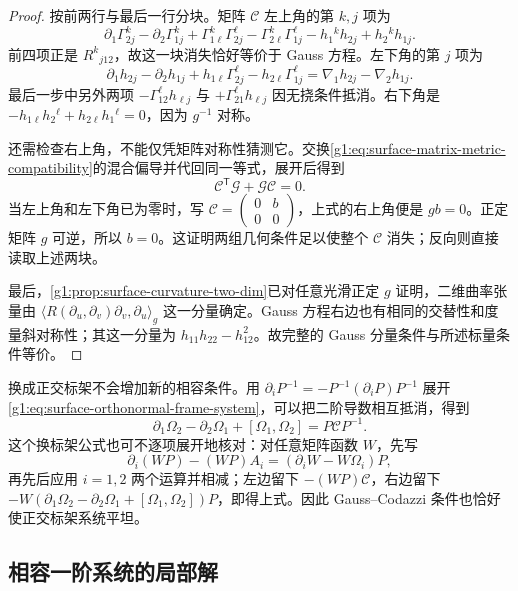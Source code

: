 \begin{proof}
	按前两行与最后一行分块。矩阵 \(\mathcal C\) 左上角的第 \(k,j\) 项为
	\[
		\partial_1\Gamma^k_{2j}-\partial_2\Gamma^k_{1j}
		+\Gamma^k_{1\ell}\Gamma^\ell_{2j}-\Gamma^k_{2\ell}\Gamma^\ell_{1j}
		-h_1{}^kh_{2j}+h_2{}^kh_{1j}.
	\]
	前四项正是 \(R^k{}_{j12}\)，故这一块消失恰好等价于 Gauss 方程。左下角的第 \(j\) 项为
	\[
		\partial_1h_{2j}-\partial_2h_{1j}
		+h_{1\ell}\Gamma^\ell_{2j}-h_{2\ell}\Gamma^\ell_{1j}
		=\nabla_1h_{2j}-\nabla_2h_{1j}.
	\]
	最后一步中另外两项 \(-\Gamma^\ell_{12}h_{\ell j}\) 与 \(+\Gamma^\ell_{21}h_{\ell j}\) 因无挠条件抵消。右下角是 \(-h_{1\ell}h_2{}^\ell+h_{2\ell}h_1{}^\ell=0\)，因为 \(g^{-1}\) 对称。

	还需检查右上角，不能仅凭矩阵对称性猜测它。交换\eqref{g1:eq:surface-matrix-metric-compatibility}的混合偏导并代回同一等式，展开后得到
	\[
		\mathcal C^{\mathsf T}\mathcal G+\mathcal G\mathcal C=0.
	\]
	当左上角和左下角已为零时，写 \(\mathcal C=\left(\begin{smallmatrix}0&b\\0&0\end{smallmatrix}\right)\)，上式的右上角便是 \(gb=0\)。正定矩阵 \(g\) 可逆，所以 \(b=0\)。这证明两组几何条件足以使整个 \(\mathcal C\) 消失；反向则直接读取上述两块。

	最后，\cref{g1:prop:surface-curvature-two-dim}已对任意光滑正定 \(g\) 证明，二维曲率张量由 \(\langle R(\partial_u,\partial_v)\partial_v,\partial_u\rangle_g\) 这一分量确定。Gauss 方程右边也有相同的交替性和度量斜对称性；其这一分量为 \(h_{11}h_{22}-h_{12}^2\)。故完整的 Gauss 分量条件与所述标量条件等价。
\end{proof}

换成正交标架不会增加新的相容条件。用 \(\partial_iP^{-1}=-P^{-1}(\partial_iP)P^{-1}\) 展开\eqref{g1:eq:surface-orthonormal-frame-system}，可以把二阶导数相互抵消，得到
\begin{equation}
	\label{g1:eq:surface-flatness-change-frame}
	\partial_1\Omega_2-\partial_2\Omega_1+[\Omega_1,\Omega_2]
	=P\mathcal CP^{-1}.
\end{equation}
这个换标架公式也可不逐项展开地核对：对任意矩阵函数 \(W\)，先写
\[
	\partial_i(WP)-(WP)A_i=(\partial_iW-W\Omega_i)P,
\]
再先后应用 \(i=1,2\) 两个运算并相减；左边留下 \(-(WP)\mathcal C\)，右边留下 \(-W(\partial_1\Omega_2-\partial_2\Omega_1+[\Omega_1,\Omega_2])P\)，即得上式。因此 Gauss–Codazzi 条件也恰好使正交标架系统平坦。

\subsection{相容一阶系统的局部解}
\label{g1:subsec:0804:03}

